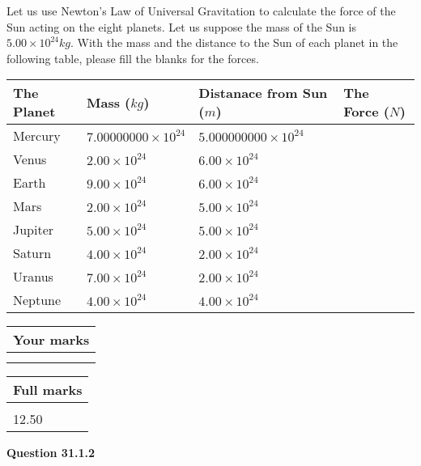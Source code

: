 \documentclass[12pt]{article}
\begin{document}
  
Let us use Newton's Law of Universal Gravitation to calculate the force
of the Sun acting on the eight planets. Let us suppose the mass of the
Sun is $ %
5.00 \times 10^{24} kg$. With the mass and the
distance to the Sun of each planet in the following table, please fill
the blanks for the forces.
 
\vspace{0.2in}
 
 
\begin{tabular}{|l|l|l|l|}
\hline
The Planet & Mass ($kg$) & Distanace from Sun ($m$) & The Force ($N$)\\
\hline
Mercury  &
           $ %
7.00000000 \times 10^{24} $   &
             $ %
5.000000000 \times 10^{24} $    &
\\  \hline
Venus    &
           $ %
2.00 \times 10^{24} $    &
             $ %
6.00 \times 10^{24} $    &
\\  \hline
Earth    &
           $ %
9.00 \times 10^{24} $    &
             $ %
6.00 \times 10^{24} $    &
\\   \hline
Mars     &
           $ %
2.00 \times 10^{24} $    &
             $ %
5.00 \times 10^{24} $    &
\\   \hline
Jupiter  &
           $ %
5.00 \times 10^{24} $    &
             $ %
5.00 \times 10^{24} $    &
\\  \hline
Saturn   &
           $ %
4.00 \times 10^{24}$    &
             $ %
2.00 \times 10^{24}$    &
\\  \hline
Uranus   &
           $ %
7.00 \times 10^{24} $    &
             $ %
2.00 \times 10^{24} $    &
\\  \hline
Neptune  &
           $ %
4.00 \times 10^{24} $    &
             $ %
4.00 \times 10^{24} $    &
\\  \hline
 
\end{tabular}
 
 

 
 

 
\vspace{0.3in}
  
\vspace{0.2in}
  
         \begin{tabular}{|l|}
\hline
 Your marks  \\
\hline
 \\ 
 \\ 
\hline
\end{tabular}
\hspace{0.05in} \begin{tabular}{|l|}
\hline
 Full marks  \\
\hline
 \\ 
12.50 \\
\hline
\end{tabular}
{\textbf{\Large{Question
31.1.2 
}}}
  
\end{document}
